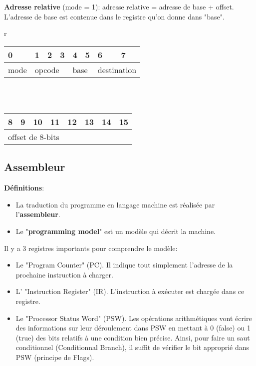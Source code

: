 \documentclass[a4paper]{article}
\begin{document}
\textbf{Adresse relative} (mode = 1): adresse relative = adresse de base + offset. L'adresse de base est contenue dans le registre qu'on donne dans "base".
\begin{center}
    \begin{tabular}{r}
        \begin{tabular}{|p{1cm}|p{1cm}|p{1cm}|p{1cm}|p{1cm}|p{1cm}|p{1cm}|p{1cm}|} \hline
            0 & 1 & 2 & 3 & 4 & 5 & 6 & 7 \\ \hline
            mode & \multicolumn{3}{l|}{opcode} & \multicolumn{2}{l|}{base} & \multicolumn{2}{l|}{destination} \\ \hline
        \end{tabular}
        \\ \\
        \begin{tabular}{|p{1cm}|p{1cm}|p{1cm}|p{1cm}|p{1cm}|p{1cm}|p{1cm}|p{1cm}|} \hline
            8 & 9 & 10 & 11 & 12 & 13 & 14 & 15 \\ \hline
            \multicolumn{8}{|l|}{offset de 8-bits} \\ \hline
        \end{tabular}
    \end{tabular}
\end{center}





\subsection{Assembleur}

\textbf{Définitions}:
\begin{itemize}
    \item La traduction du programme en langage machine est réalisée par l'\textbf{assembleur}.
    \item Le "\textbf{programming model}" est un modèle qui décrit la machine.
\end{itemize}

Il y a 3 registres importants pour comprendre le modèle:
\begin{itemize}
    \item Le "Program Counter" (PC). Il indique tout simplement l’adresse de la prochaine instruction à charger.
    \item L' "Instruction Register" (IR). L'instruction à exécuter est chargée dans ce registre.
    \item Le "Processor Status Word" (PSW). Les opérations arithmétiques vont écrire des informations sur leur déroulement dans PSW en mettant à 0 (false) ou 1 (true) des bits relatifs à une condition bien précise. Ainsi, pour faire un saut conditionnel (Conditionnal Branch), il suffit de vérifier le bit approprié dans PSW (principe de Flags).
\end{itemize}
\end{document}
